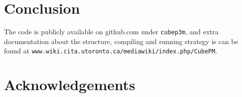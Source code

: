 \section{Conclusion}

The code is publicly available on github.com under {\tt cubep3m}, and extra documentation about the structure, 
compiling and running strategy is can be found at {\tt www.wiki.cita.utoronto.ca/mediawiki/index.php/CubePM}.

\section*{Acknowledgements}
